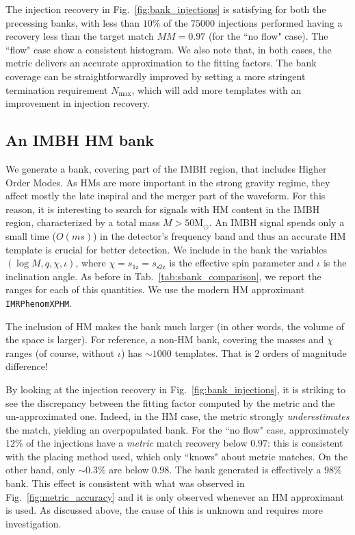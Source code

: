 \documentclass[twocolumn,showpacs,preprintnumbers,nofootinbib,prd,
superscriptaddress,10pt]{revtex4-2}
\begin{document}
The injection recovery in Fig.~\ref{fig:bank_injections} is satisfying for both the precessing banks, with less than $10\%$ of the $75000$ injections performed having a recovery less than the target match $MM = 0.97$ (for the ``no flow" case). The ``flow" case show a consistent histogram.
We also note that, in both cases, the metric delivers an accurate approximation to the fitting factors.
The bank coverage can be straightforwardly improved by setting a more stringent termination requirement $N_\text{max}$, which will add more templates with an improvement in injection recovery.

\subsection{An IMBH HM bank}\label{sec:HM_bank}

We generate a bank, covering part of the IMBH region, that includes Higher Order Modes. As HMs are more important in the strong gravity regime, they affect mostly the late inspiral and the merger part of the waveform.
For this reason, it is interesting to search for signals with HM content in the IMBH region, characterized by a total mass $M>50 \mathrm{M_\odot}$. An IMBH signal spends only a small time ($O(ms)$) in the detector's frequency band and thus an accurate HM template is crucial for better detection.
We include in the bank the variables $\left( \log M, q, \chi, \iota \right)$, where $\chi=s_\text{1z}=s_\text{s2z}$ is the effective spin parameter and $\iota$ is the inclination angle.
As before in Tab.~\ref{tab:sbank_comparison}, we report the ranges for each of this quantities. We use the modern HM approximant \texttt{IMRPhenomXPHM}.

The inclusion of HM makes the bank much larger (in other words, the volume of the space is larger). For reference, a non-HM bank, covering the masses and $\chi$ ranges (of course, without $\iota$) has $\sim 1000$ templates. That is 2 orders of magnitude difference!

By looking at the injection recovery in Fig.~\ref{fig:bank_injections}, it is striking to see the discrepancy between the fitting factor computed by the metric and the un-approximated one. Indeed, in the HM case, the metric strongly {\it underestimates} the match, yielding an overpopulated bank. For the ``no flow" case, approximately $12\%$ of the injections have a {\it metric} match recovery below $0.97$: this is consistent with the placing method used, which only ``knows" about metric matches. On the other hand, only $\sim 0.3\%$ are below $0.98$. The bank generated is effectively a $98\%$ bank.
This effect is consistent with what was observed in Fig.~\ref{fig:metric_accuracy} and it is only observed whenever an HM approximant is used. As discussed above, the cause of this is unknown and requires more investigation.
\end{document}
